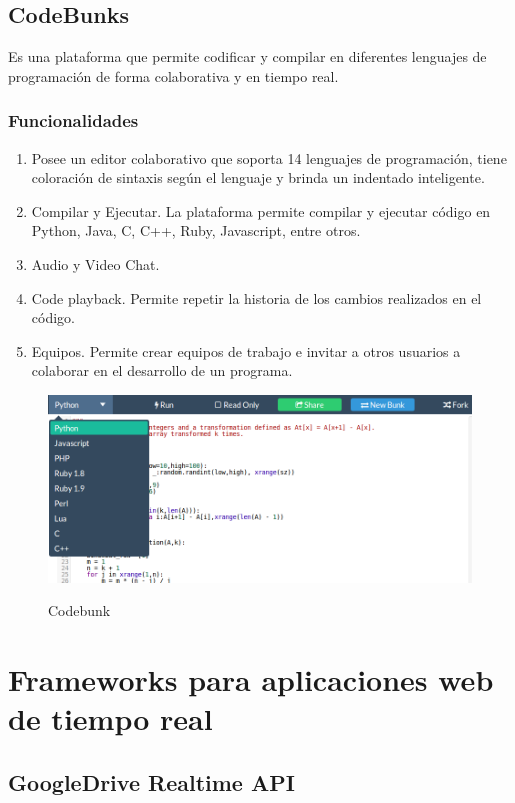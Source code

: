 \subsection{CodeBunks}
Es una plataforma que permite codificar y compilar en diferentes lenguajes de programación de forma colaborativa y en tiempo real.
\subsubsection{Funcionalidades}
\begin{enumerate}
  \item Posee un editor colaborativo que soporta 14 lenguajes de programación, tiene coloración de sintaxis según el lenguaje y brinda un indentado inteligente.
  \item Compilar y Ejecutar. La plataforma permite compilar y ejecutar código en Python, Java, C, C++, Ruby, Javascript, entre otros.
  \item Audio y Video Chat.
  \item Code playback. Permite repetir la historia de los cambios realizados en el código.
  \item Equipos. Permite crear equipos de trabajo e invitar a otros usuarios a colaborar en el desarrollo de un programa.
\end{enumerate}
\begin{figure}[h]
  \centering
  \includegraphics[scale=0.3]{figuras/codebunk.png}\\
  \caption{Codebunk}\label{fig:codebunk}
\end{figure}
\section{Frameworks para aplicaciones web de tiempo real}

\subsection{GoogleDrive Realtime API}

